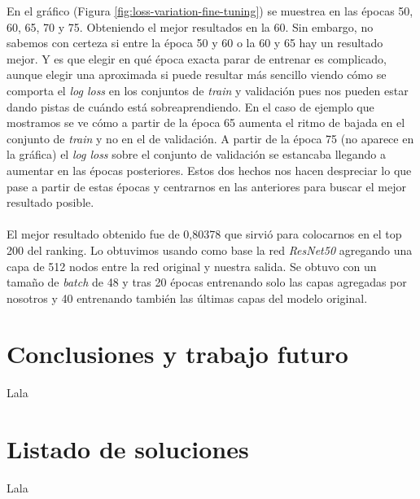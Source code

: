 En el gráfico (Figura \ref{fig:loss-variation-fine-tuning}) se muestrea en las épocas 50, 60, 65, 70 y 75. Obteniendo el mejor resultados en la 60. Sin embargo, no sabemos con certeza si entre la época 50 y 60 o la 60 y 65 hay un resultado mejor. Y es que elegir en qué época exacta parar de entrenar es complicado, aunque elegir una aproximada si puede resultar más sencillo viendo cómo se comporta el \textit{log loss} en los conjuntos de \textit{train} y validación pues nos pueden estar dando pistas de cuándo está sobreaprendiendo. En el caso de ejemplo que mostramos se ve cómo a partir de la época 65 aumenta el ritmo de bajada en el conjunto de \textit{train} y no en el de validación. A partir de la época 75 (no aparece en la gráfica) el \textit{log loss} sobre el conjunto de validación se estancaba llegando a aumentar en las épocas posteriores. Estos dos hechos nos hacen despreciar lo que pase a partir de estas épocas y centrarnos en las anteriores para buscar el mejor resultado posible.
\\ \\
El mejor resultado obtenido fue de 0,80378 que sirvió para colocarnos en el top 200 del ranking. Lo obtuvimos usando como base la red \textit{ResNet50} agregando una capa de 512 nodos entre la red original y nuestra salida. Se obtuvo con un tamaño de \textit{batch} de 48 y tras 20 épocas entrenando solo las capas agregadas por nosotros y 40 entrenando también las últimas capas del modelo original.

\section{Conclusiones y trabajo futuro}

Lala

\section{Listado de soluciones}

Lala


\newpage


